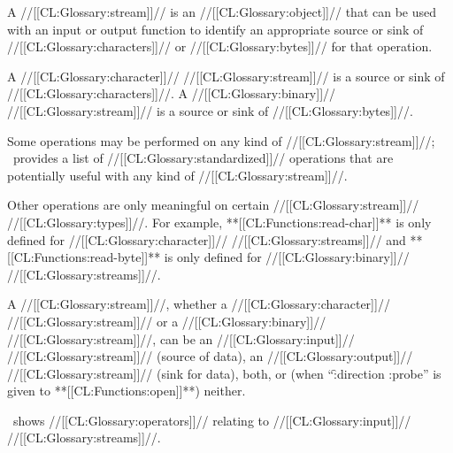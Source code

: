 





A //[[CL:Glossary:stream]]// is an //[[CL:Glossary:object]]// that can be used with an input or output
function to identify an appropriate source or sink of //[[CL:Glossary:characters]]// or 
//[[CL:Glossary:bytes]]// for that operation.


A //[[CL:Glossary:character]]// //[[CL:Glossary:stream]]// is a source or sink of //[[CL:Glossary:characters]]//.
A //[[CL:Glossary:binary]]// //[[CL:Glossary:stream]]// is a source or sink of //[[CL:Glossary:bytes]]//.

Some operations may be performed on any kind of //[[CL:Glossary:stream]]//;
\thenextfigure\ provides a list of //[[CL:Glossary:standardized]]// operations
that are potentially useful with any kind of //[[CL:Glossary:stream]]//.


Other operations are only meaningful on certain //[[CL:Glossary:stream]]// //[[CL:Glossary:types]]//.
For example, **[[CL:Functions:read-char]]** is only defined for //[[CL:Glossary:character]]// //[[CL:Glossary:streams]]//
and **[[CL:Functions:read-byte]]** is only defined for //[[CL:Glossary:binary]]// //[[CL:Glossary:streams]]//.




A //[[CL:Glossary:stream]]//, whether a //[[CL:Glossary:character]]// //[[CL:Glossary:stream]]// or a //[[CL:Glossary:binary]]// //[[CL:Glossary:stream]]//,
can be an //[[CL:Glossary:input]]// //[[CL:Glossary:stream]]// (source of data),
       an //[[CL:Glossary:output]]// //[[CL:Glossary:stream]]// (sink for data),
       both, 
    or (\eg when ``\f{:direction :probe}'' is given to **[[CL:Functions:open]]**) neither.

\Thenextfigure\ shows //[[CL:Glossary:operators]]// relating to
//[[CL:Glossary:input]]// //[[CL:Glossary:streams]]//.


